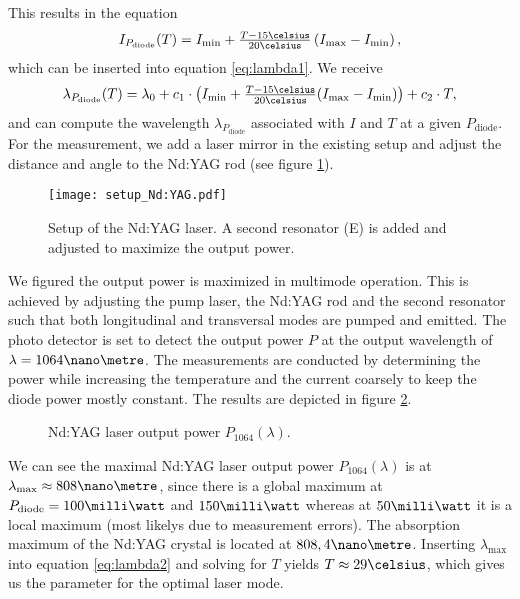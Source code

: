 This results in the equation
\begin{align}
I_{P_\text{diode}}(T)=I_\text{min}+\tfrac{T-15\celsius}{20\celsius}\left(I_\text{max}-I_\text{min}\right),
\label{eq:current_P}
\end{align}
which can be inserted into equation \eqref{eq:lambda1}. We receive
\begin{align}
\lambda_{P_\text{diode}}(T)=\lambda_0+c_1\cdot \left(I_\text{min}+\tfrac{T-15\celsius}{20\celsius}(I_\text{max}-I_\text{min})\right)+c_2\cdot T,
\label{eq:lambda2}
\end{align}
and can compute the wavelength $\lambda_{P_\text{diode}}$ associated with $I$ and $T$ at a given $P_\text{diode}$.
For the measurement, we add a laser mirror in the existing setup and adjust the distance and angle to the Nd:YAG rod (see figure \ref{fig:setup_Nd:YAG}).

\begin{figure}[h]
	\centering
	\texttt{[image: setup\_Nd:YAG.pdf]}
	\caption[Setup of the Nd:YAG laser]{Setup of the Nd:YAG laser. A second resonator (E) is added and adjusted to maximize the output power. \cite{lit:manual}}
	\label{fig:setup_Nd:YAG}
\end{figure}

We figured the output power is maximized in multimode operation. This is achieved by adjusting the pump laser, the Nd:YAG rod and the second resonator such that both longitudinal and transversal modes are pumped and emitted.
The photo detector is set to detect the output power $P$ at the output wavelength of $\lambda=1064\nano\metre$. The measurements are conducted by determining the power while increasing the temperature and the current coarsely to keep the diode power mostly constant.
The results are depicted in figure \ref{fig:lambda2}.

\begin{figure}[h]
	\centering
	
	\caption{Nd:YAG laser output power $P_{1064}(\lambda)$.}
	\label{fig:lambda2}
\end{figure}

We can see the maximal Nd:YAG laser output power $P_{1064}(\lambda)$ is at $\lambda_\text{max}\approx 808\nano\metre$, since there is a global maximum at $P_\text{diode}=100\milli\watt$ and $150\milli\watt$ whereas at $50\milli\watt$ it is a local maximum (most likelys due to measurement errors).
The absorption maximum of the Nd:YAG crystal is located at $808,4\nano\metre$. Inserting $\lambda_\text{max}$ into equation \eqref{eq:lambda2} and solving for $T$ yields $T\approx 29\celsius$, which gives us the parameter for the optimal laser mode.
